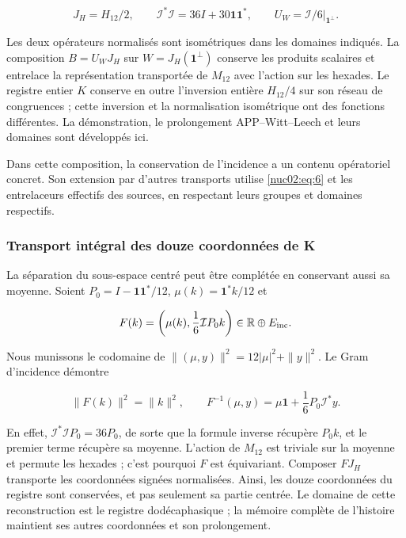 \[
J_H=H_{12}/2,\qquad
\mathcal I^*\mathcal I=36I+30\mathbf1\mathbf1^*,\qquad
U_W=\mathcal I/6\big|_{\mathbf1^\perp}.
\]

Les deux opérateurs normalisés sont isométriques dans les domaines indiqués. La composition \(B=U_WJ_H\) sur \(W=J_H(\mathbf1^\perp)\) conserve les produits scalaires et entrelace la représentation transportée de \(M_{12}\) avec l’action sur les hexades. Le registre entier \(K\) conserve en outre l’inversion entière \(H_{12}/4\) sur son réseau de congruences ; cette inversion et la normalisation isométrique ont des fonctions différentes. La démonstration, le prolongement APP–Witt–Leech et leurs domaines sont développés ici.


Dans cette composition, la conservation de l’incidence a un contenu opératoriel concret. Son extension par d’autres transports utilise \eqref{nuc02:eq:6} et les entrelaceurs effectifs des sources, en respectant leurs groupes et domaines respectifs.

\subsubsection{Transport intégral des douze coordonnées de K}

La séparation du sous-espace centré peut être complétée en conservant aussi sa moyenne. Soient \(P_0=I-\mathbf1\mathbf1^*/12\), \(\mu(k)=\mathbf1^*k/12\) et

\[
F(k)=\left(\mu(k),\frac16\mathcal I P_0k\right)\in\mathbb R\oplus E_{\rm inc}.
\]

Nous munissons le codomaine de \(\|(\mu,y)\|^2=12|\mu|^2+\|y\|^2\). Le Gram d’incidence démontre

\begin{equation}
\|F(k)\|^2=\|k\|^2,\qquad
\boxed{F^{-1}(\mu,y)=\mu\mathbf1+\frac16P_0\mathcal I^*y.}\label{nuc02:eq:6a}
\end{equation}

En effet, \(\mathcal I^*\mathcal I P_0=36P_0\), de sorte que la formule inverse récupère \(P_0k\), et le premier terme récupère sa moyenne. L’action de \(M_{12}\) est triviale sur la moyenne et permute les hexades ; c’est pourquoi \(F\) est équivariant. Composer \(FJ_H\) transporte les coordonnées signées normalisées. Ainsi, les douze coordonnées du registre sont conservées, et pas seulement sa partie centrée. Le domaine de cette reconstruction est le registre dodécaphasique ; la mémoire complète de l’histoire maintient ses autres coordonnées et son prolongement.


